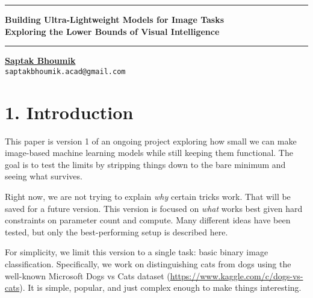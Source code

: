 \documentclass{article}
\begin{document}
\noindent\rule{\textwidth}{0.4pt}

\begin{center}
{\LARGE\bfseries Building Ultra-Lightweight Models for Image Tasks\\ \large Exploring the Lower Bounds of Visual Intelligence} 
\end{center}

\noindent\rule{\textwidth}{0.4pt}

\vspace{1em}

\begin{center}
\href{https://saptakbhoumik.github.io/}{\textbf{Saptak Bhoumik}} \\
\small\texttt{saptakbhoumik.acad@gmail.com}
\end{center}

\begin{abstract}
\noindent Most image-based ML models today are bulky, data-hungry, and overkill for many practical tasks. This project takes the opposite approach, how small can we go while still getting the job done?

\noindent We explore a range of techniques to aggressively shrink image models, from replacing learned filters with handcrafted ones to simplifying architecture designs,  and other clever tricks.
\end{abstract}

\section*{1. Introduction}

This paper is version 1 of an ongoing project exploring how small we can make image-based machine learning models while still keeping them functional. The goal is to test the limits by stripping things down to the bare minimum and seeing what survives.

Right now, we are not trying to explain \textit{why} certain tricks work. That will be saved for a future version. This version is focused on \textit{what} works best given hard constraints on parameter count and compute. Many different ideas have been tested, but only the best-performing setup is described here.

For simplicity, we limit this version to a single task: basic binary image classification. Specifically, we work on distinguishing cats from dogs using the well-known Microsoft Dogs vs Cats dataset (\url{https://www.kaggle.com/c/dogs-vs-cats}). It is simple, popular, and just complex enough to make things interesting.
\end{document}

